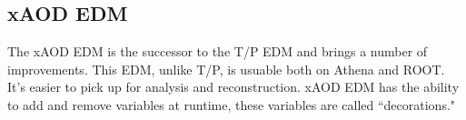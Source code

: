 \subsection{xAOD EDM}
The xAOD EDM is the successor to the T/P EDM and brings a number of improvements.
This EDM, unlike T/P, is usuable both on Athena and ROOT.
It's easier to pick up for analysis and reconstruction. 
xAOD EDM has the ability to add and remove variables at runtime, these variables are called ``decorations."

